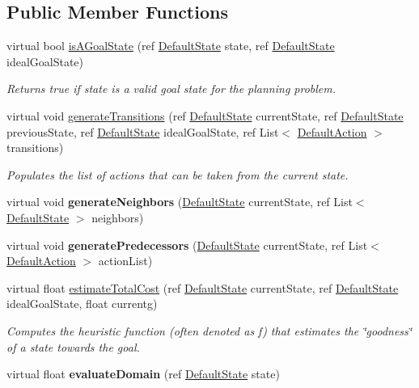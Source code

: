 \subsection*{Public Member Functions}
\begin{DoxyCompactItemize}
\item 
virtual bool \hyperlink{class_planning_domain_base_a56907006c1e4a4071f58da65705792d1}{is\-A\-Goal\-State} (ref \hyperlink{class_default_state}{Default\-State} state, ref \hyperlink{class_default_state}{Default\-State} ideal\-Goal\-State)
\begin{DoxyCompactList}\small\item\em Returns true if state is a valid goal state for the planning problem. \end{DoxyCompactList}\item 
virtual void \hyperlink{class_planning_domain_base_adbca97ccf882076eb737b8bebf1fb1ea}{generate\-Transitions} (ref \hyperlink{class_default_state}{Default\-State} current\-State, ref \hyperlink{class_default_state}{Default\-State} previous\-State, ref \hyperlink{class_default_state}{Default\-State} ideal\-Goal\-State, ref List$<$ \hyperlink{class_default_action}{Default\-Action} $>$ transitions)
\begin{DoxyCompactList}\small\item\em Populates the list of actions that can be taken from the current state. \end{DoxyCompactList}\item 
\hypertarget{class_planning_domain_base_ac045b562142c74659dd0624ae38f670e}{virtual void {\bfseries generate\-Neighbors} (\hyperlink{class_default_state}{Default\-State} current\-State, ref List$<$ \hyperlink{class_default_state}{Default\-State} $>$ neighbors)}\label{class_planning_domain_base_ac045b562142c74659dd0624ae38f670e}

\item 
\hypertarget{class_planning_domain_base_a94174e0d5948bd2b8f611a36050fcc95}{virtual void {\bfseries generate\-Predecessors} (\hyperlink{class_default_state}{Default\-State} current\-State, ref List$<$ \hyperlink{class_default_action}{Default\-Action} $>$ action\-List)}\label{class_planning_domain_base_a94174e0d5948bd2b8f611a36050fcc95}

\item 
virtual float \hyperlink{class_planning_domain_base_a4d0f803c0d3dfb3f59526078db674a4f}{estimate\-Total\-Cost} (ref \hyperlink{class_default_state}{Default\-State} current\-State, ref \hyperlink{class_default_state}{Default\-State} ideal\-Goal\-State, float currentg)
\begin{DoxyCompactList}\small\item\em Computes the heuristic function (often denoted as f) that estimates the \char`\"{}goodness\char`\"{} of a state towards the goal. \end{DoxyCompactList}\item 
\hypertarget{class_planning_domain_base_a123435365f69b0c6969b3c69f05fb007}{virtual float {\bfseries evaluate\-Domain} (ref \hyperlink{class_default_state}{Default\-State} state)}\label{class_planning_domain_base_a123435365f69b0c6969b3c69f05fb007}


\end{DoxyCompactItemize}
